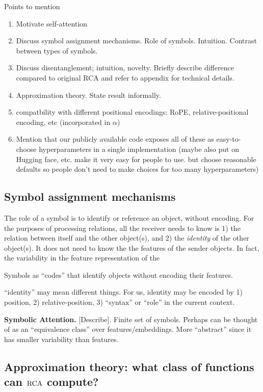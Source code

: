 Points to mention
\begin{enumerate}
  \item Motivate self-attention 
  \item Discuss symbol assignment mechanisms. Role of symbols. Intuition. Contrast between types of symbols.
  \item Discuss disentanglement; intuition, novelty. Briefly describe difference compared to original RCA and refer to appendix for technical details.
  \item Approximation theory. State result informally.
  \item compatbility with different positional encodings: RoPE, relative-positional encoding, etc (incorporated in $\alpha$)
  \item Mention that our publicly available code exposes all of these as easy-to-choose hyperparameters in a single implementation (maybe also put on Hugging face, etc. make it very easy for people to use. but choose reasonable defaults so people don't need to make choices for too many hyperparameters)
\end{enumerate}

\subsection{Symbol assignment mechanisms}
The role of a symbol is to identify or reference an object, without encoding. For the purposes of processing relations, all the receiver needs to know is 1) the relation between itself and the other object(s), and 2) the \textit{identity} of the other object(s). It does not need to know the the features of the sender objects. In fact, the variability in the feature representation of the 

Symbols as ``codes'' that identify objects without encoding their features.

``identity'' may mean different things. For us, identity may be encoded by 1) position, 2) relative-position, 3) ``syntax'' or ``role'' in the current context.

\textbf{Symbolic Attention.} [Describe]. Finite set of symbols. Perhaps can be thought of as an ``equivalence class'' over features/embeddings. More ``abstract'' since it has smaller variability than features.



\subsection{Approximation theory: what class of functions can $\mathrm{RCA}$ compute?}

